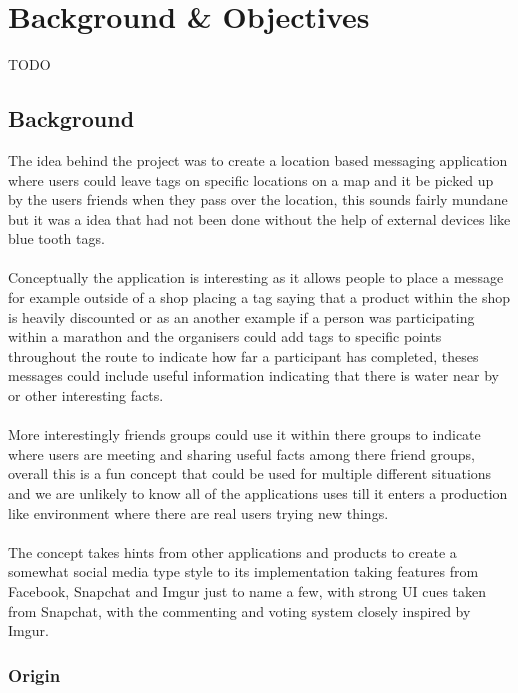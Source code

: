 \chapter{Background \& Objectives}

{TODO}



\section{Background}

The idea behind the project was to create a location based messaging application where users could leave tags on specific locations on a map and it be picked up by the users friends when they pass over the location, this sounds fairly mundane but it was a idea that had not been done without the help of external devices like blue tooth tags.\\
\\
Conceptually the application is interesting as it allows people to place a message for example outside of a shop placing a tag saying that a product within the shop is heavily discounted or as an another example if a person was participating within a marathon and the organisers could add tags to specific points throughout the route to indicate how far a participant has completed, theses messages could include useful information indicating that there is water near by or other interesting facts.\\
\\
More interestingly friends groups could use it within there groups to indicate where users are meeting and sharing useful facts among there friend groups, overall this is a fun concept that could be used for multiple different situations and we are unlikely to know all of the applications uses till it enters a production like environment where there are real users trying new things.\\
\\
The concept takes hints from other applications and products to create a somewhat social media type style to its implementation taking features from Facebook, Snapchat and Imgur just to name a few, with strong UI cues taken from Snapchat, with the commenting and voting system closely inspired by Imgur.

\subsection{Origin}

